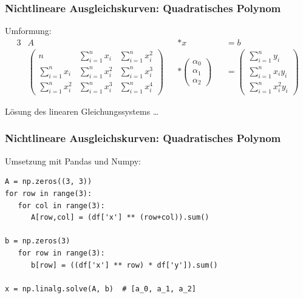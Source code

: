 \begin{frame}
\frametitle{Nichtlineare Ausgleichskurven: Quadratisches Polynom}

Umformung:
\setcounter{equation}{0}
\begin{alignat*}{3}
& A &&* x &&= b \\
& \begin{pmatrix}
	n & \sum_{i=1}^{n} x_i & \sum_{i=1}^{n} x_i^2 \\
	\sum_{i=1}^{n} x_i & \sum_{i=1}^{n} x_i^2 & \sum_{i=1}^{n} x_i^3 \\
	\sum_{i=1}^{n} x_i^2 & \sum_{i=1}^{n} x_i^3 & \sum_{i=1}^{n} x_i^4
\end{pmatrix} &&* \begin{pmatrix}
	\alpha_0 \\
	\alpha_1 \\
	\alpha_2
\end{pmatrix} &&= \begin{pmatrix}
	\sum_{i=1}^{n} y_i \\
	\sum_{i=1}^{n} x_i y_i \\
	\sum_{i=1}^{n} x_i^2 y_i
\end{pmatrix}
\end{alignat*}

\vspace{1cm}

Lösung des linearen Gleichungssystems \dots

\end{frame}


\begin{frame}[fragile]
\frametitle{Nichtlineare Ausgleichskurven: Quadratisches Polynom}

Umsetzung mit Pandas und Numpy:

\begin{verbatim}
A = np.zeros((3, 3))
for row in range(3):
   for col in range(3):
      A[row,col] = (df['x'] ** (row+col)).sum()

b = np.zeros(3)
   for row in range(3):
      b[row] = ((df['x'] ** row) * df['y']).sum()

x = np.linalg.solve(A, b)  # [a_0, a_1, a_2]
\end{verbatim}

\end{frame}


